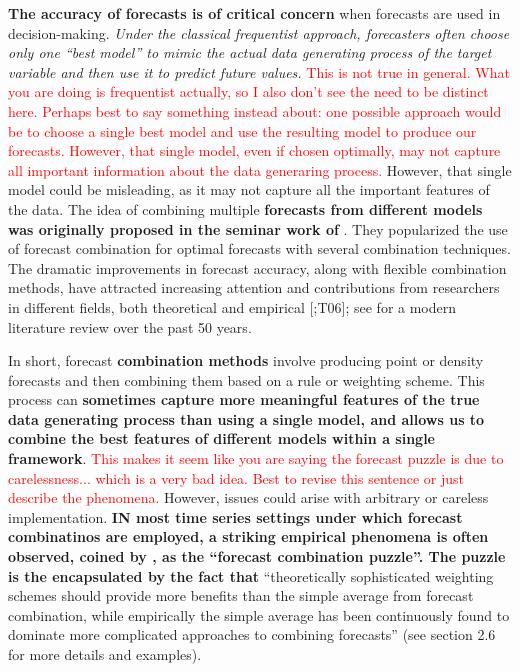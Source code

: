 \documentclass{monashthesis}
\begin{document}
\textbf{The accuracy of forecasts is of critical concern} when forecasts are used in decision-making. \emph{Under the classical frequentist approach, forecasters often choose only one ``best model'' to mimic the actual data generating process of the target variable and then use it to predict future values.} \textcolor{red}{This is not true in general. What you are doing is frequentist actually, so I also don't see the need to be distinct here. Perhaps best to say something instead about: one possible approach would be to choose a single best model and use the resulting model to produce our forecasts. However, that single model, even if chosen optimally, may not capture all important information about the data generaring process.} However, that single model could be misleading, as it may not capture all the important features of the data. The idea of combining multiple \textbf{forecasts from different models was originally proposed in the seminar work of } \textcite{BG69}. They popularized the use of forecast combination for optimal forecasts with several combination techniques. The dramatic improvements in forecast accuracy, along with flexible combination methods, have attracted increasing attention and contributions from researchers in different fields, both theoretical and empirical {[}\textcite{C89};T06{]}; see \textcite{WHLK22} for a modern literature review over the past 50 years.

In short, forecast \textbf{combination methods} involve producing point or density forecasts and then combining them based on a rule or weighting scheme. This process can \textbf{sometimes capture more meaningful features of the true data generating process than using a single model, and allows us to combine the best features of different models within a single framework}. \textcolor{red}{This makes it seem like you are saying the forecast puzzle is due to carelessness... which is a very bad idea. Best to revise this sentence or just describe the phenomena.} However, issues could arise with arbitrary or careless implementation. \textbf{IN most time series settings under which forecast combinatinos are employed, a striking empirical phenomena is often observed, coined by \textcite{SW04}, as the ``forecast combination puzzle''. The puzzle is the encapsulated by the fact that} ``theoretically sophisticated weighting schemes should provide more benefits than the simple average from forecast combination, while empirically the simple average has been continuously found to dominate more complicated approaches to combining forecasts'' \autocite{WHLK22} (see section 2.6 for more details and examples).
\end{document}
